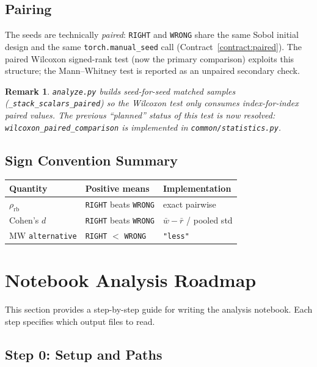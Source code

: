 \documentclass[11pt]{article}
\newtheorem{remark}{Remark}[section]
\newcommand{\RIGHT}{\texttt{RIGHT}}
\newcommand{\WRONG}{\texttt{WRONG}}
\begin{document}
\subsection{Pairing}
 
The seeds are technically \emph{paired}: \RIGHT{} and \WRONG{} share the same Sobol
initial design and the same \texttt{torch.manual\_seed} call
(Contract~\ref{contract:paired}).
The paired Wilcoxon signed-rank test (now the primary comparison) exploits this
structure; the Mann--Whitney test is reported as an unpaired secondary check.

\begin{remark}
\texttt{analyze.py} builds seed-for-seed matched samples
(\texttt{\_stack\_scalars\_paired}) so the Wilcoxon test only consumes index-for-index
paired values. The previous ``planned'' status of this test is now resolved:
\texttt{wilcoxon\_paired\_comparison} is implemented in
\texttt{common/statistics.py}.
\end{remark}
 
\subsection{Sign Convention Summary}
 
\begin{center}
\begin{tabular}{lll}
\toprule
Quantity & Positive means & Implementation \\
\midrule
$\rho_{\mathrm{rb}}$ & \RIGHT{} beats \WRONG{} & exact pairwise \\
Cohen's $d$ & \RIGHT{} beats \WRONG{} & $\bar{w} - \bar{r}$ / pooled std \\
MW \texttt{alternative} & \RIGHT{} $<$ \WRONG{} & \texttt{"less"} \\
\bottomrule
\end{tabular}
\end{center}
 
\section{Notebook Analysis Roadmap}
\label{sec:notebook}
 
This section provides a step-by-step guide for writing the analysis notebook.
Each step specifies which output files to read.
 
\subsection{Step 0: Setup and Paths}
 
\end{document}
